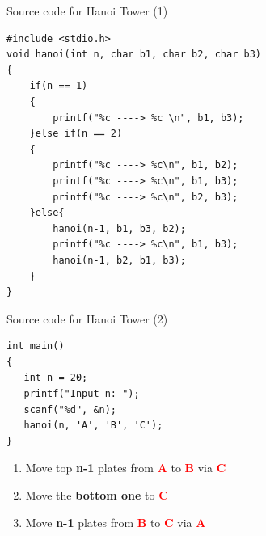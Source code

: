\begin{frame}[fragile]{Source code for Hanoi Tower (1)}
\vspace{-0.15in}
\begin{lstlisting}[xleftmargin=0.02\linewidth, linewidth=0.85\linewidth]
#include <stdio.h>
void hanoi(int n, char b1, char b2, char b3)
{
    if(n == 1)
    {
        printf("%c ----> %c \n", b1, b3);
    }else if(n == 2)
    {
        printf("%c ----> %c\n", b1, b2);
        printf("%c ----> %c\n", b1, b3);
        printf("%c ----> %c\n", b2, b3);
    }else{
        hanoi(n-1, b1, b3, b2);
        printf("%c ----> %c\n", b1, b3);
        hanoi(n-1, b2, b1, b3);
    }
}
\end{lstlisting}
\vspace{-0.1in}

\end{frame}

\begin{frame}[fragile]{Source code for Hanoi Tower (2)}
\vspace{-0.15in}
\begin{lstlisting}[firstnumber=19, xleftmargin=0.02\linewidth, linewidth=0.85\linewidth]
int main()
{
   int n = 20;
   printf("Input n: ");
   scanf("%d", &n);
   hanoi(n, 'A', 'B', 'C');
}
\end{lstlisting}
\begin{enumerate}
	\item {Move top \textbf{n-1} plates from \textcolor{red}{\textbf{A}} to \textcolor{red}{\textbf{B}} via \textcolor{red}{\textbf{C}}}
	\item {Move the \textbf{bottom one} to \textcolor{red}{\textbf{C}}}
	\item {Move \textbf{n-1} plates from \textcolor{red}{\textbf{B}} to \textcolor{red}{\textbf{C}} via \textcolor{red}{\textbf{A}}}
\end{enumerate}
\end{frame}